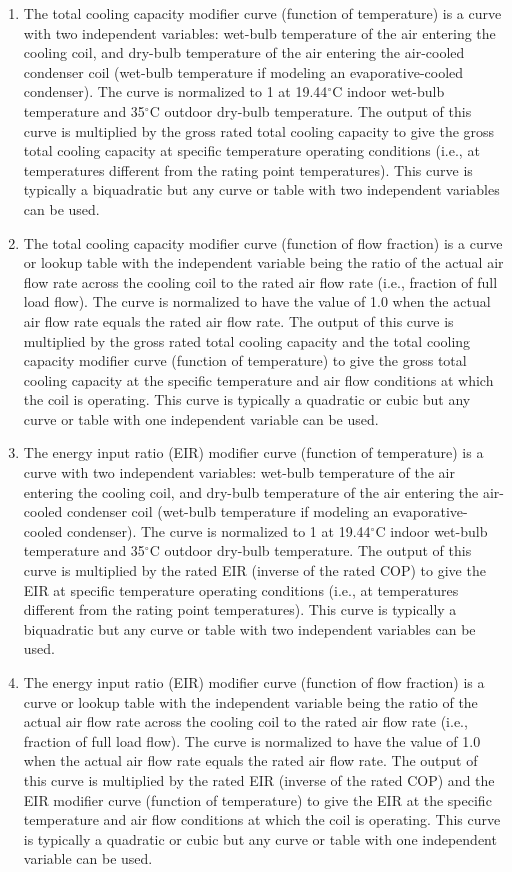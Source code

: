\begin{enumerate}
\def\labelenumi{\arabic{enumi}.}
\item
  The total cooling capacity modifier curve (function of temperature) is a curve with two independent variables: wet-bulb temperature of the air entering the cooling coil, and dry-bulb temperature of the air entering the air-cooled condenser coil (wet-bulb temperature if modeling an evaporative-cooled condenser). The curve is normalized to 1 at 19.44$^\circ$C indoor wet-bulb temperature and 35$^\circ$C outdoor dry-bulb temperature. The output of this curve is multiplied by the gross rated total cooling capacity to give the gross total cooling capacity at specific temperature operating conditions (i.e., at temperatures different from the rating point temperatures). This curve is typically a biquadratic but any curve or table with two independent variables can be used.
\item
  The total cooling capacity modifier curve (function of flow fraction) is a curve or lookup table with the independent variable being the ratio of the actual air flow rate across the cooling coil to the rated air flow rate (i.e., fraction of full load flow). The curve is normalized to have the value of 1.0 when the actual air flow rate equals the rated air flow rate. The output of this curve is multiplied by the gross rated total cooling capacity and the total cooling capacity modifier curve (function of temperature) to give the gross total cooling capacity at the specific temperature and air flow conditions at which the coil is operating. This curve is typically a quadratic or cubic but any curve or table with one independent variable can be used.
\item
  The energy input ratio (EIR) modifier curve (function of temperature) is a curve with two independent variables: wet-bulb temperature of the air entering the cooling coil, and dry-bulb temperature of the air entering the air-cooled condenser coil (wet-bulb temperature if modeling an evaporative-cooled condenser). The curve is normalized to 1 at 19.44$^\circ$C indoor wet-bulb temperature and 35$^\circ$C outdoor dry-bulb temperature. The output of this curve is multiplied by the rated EIR (inverse of the rated COP) to give the EIR at specific temperature operating conditions (i.e., at temperatures different from the rating point temperatures). This curve is typically a biquadratic but any curve or table with two independent variables can be used.
\item
  The energy input ratio (EIR) modifier curve (function of flow fraction) is a curve or lookup table with the independent variable being the ratio of the actual air flow rate across the cooling coil to the rated air flow rate (i.e., fraction of full load flow). The curve is normalized to have the value of 1.0 when the actual air flow rate equals the rated air flow rate. The output of this curve is multiplied by the rated EIR (inverse of the rated COP) and the EIR modifier curve (function of temperature) to give the EIR at the specific temperature and air flow conditions at which the coil is operating. This curve is typically a quadratic or cubic but any curve or table with one independent variable can be used.

\end{enumerate}

